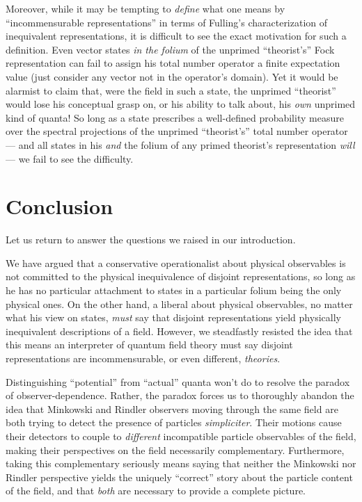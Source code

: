 \documentclass[12pt]{article}
\theoremstyle{remark}
\theoremstyle{definition}
\begin{document}
Moreover, while it may be tempting to \emph{define} what one means by
``incommensurable representations'' in terms of Fulling's
characterization of inequivalent representations, it is difficult to
see the exact motivation for such a definition.  Even vector states
\emph{in the folium} of the unprimed ``theorist's'' Fock
representation can fail to assign his total number operator a finite
expectation value (just consider any vector not in the operator's
domain). Yet it would be alarmist to claim that, were the field in
such a state, the unprimed ``theorist'' would lose his conceptual
grasp on, or his ability to talk about, his \emph{own} unprimed kind
of quanta!  So long as a state prescribes a well-defined probability
measure over the spectral projections of the unprimed ``theorist's''
total number operator --- and all states in his \emph{and} the folium
of any primed theorist's representation \emph{will} --- we fail to see
the difficulty.

  
\section{Conclusion}
  
Let us return to answer the questions we raised in our introduction.
  
We have argued that a conservative operationalist about physical
observables is not committed to the physical inequivalence of disjoint
representations, so long as he has no particular attachment to states
in a particular folium being the only physical ones.  On the other
hand, a liberal about physical observables, no matter what his view on
states, \emph{must} say that disjoint representations yield physically
inequivalent descriptions of a field.  However, we steadfastly
resisted the idea that this means an interpreter of quantum field
theory must say disjoint representations are incommensurable, or even
different, \emph{theories}.

Distinguishing ``potential'' from ``actual'' quanta won't do to
resolve the paradox of observer-dependence.  Rather, the paradox
forces us to thoroughly abandon the idea that Minkowski and Rindler
observers moving through the same field are both trying to detect the
presence of particles \emph{simpliciter}.  Their motions cause their
detectors to couple to \emph{different} incompatible particle
observables of the field, making their perspectives on the field
necessarily complementary.  Furthermore, taking this complementary
seriously means saying that neither the Minkowski nor Rindler
perspective yields the uniquely ``correct'' story about the particle
content of the field, and that \emph{both} are necessary to provide a
complete picture.
 
\end{document}
